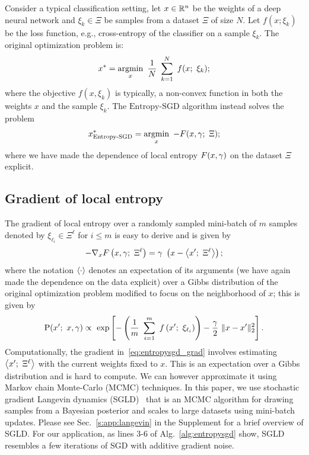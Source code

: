 \documentclass[10pt]{article}
\newcommand{\entropysgd}{\mathrm{Entropy}\textrm{-}\mathrm{SGD}}
\newcommand{\minibatch}[1]{\Xi^{#1}}
\begin{document}
Consider a typical classification setting, let $x \in \mathbb{R}^n$ be the weights of a deep neural network and $\xi_k \in \Xi$ be samples from a dataset $\Xi$ of size $N$. Let $f(x; \xi_k)$ be the loss function, e.g., cross-entropy of the classifier on a sample $\xi_k$. The original optimization problem is:
\begin{equation}
    x^* = \operatorname*{argmin}_x\ \frac{1}{N}\ \sum_{k=1}^N\ f(x;\ \xi_k);
    \label{eq:dnn_objective}
\end{equation}
where the objective $f(x, \xi_k)$ is typically, a non-convex function in both the weights $x$ and the sample $\xi_k$. The $\entropysgd$ algorithm instead solves the problem
\begin{equation}
    x^*_{\entropysgd} = \argmin_x\ -F(x, \gamma;\ \Xi);
    \label{eq:entropysgd_objective}
\end{equation}
where we have made the dependence of local entropy $F(x,\gamma)$ on the dataset $\Xi$ explicit.

\subsection{Gradient of local entropy}
\label{ss:grad_local_entropy}

The gradient of local entropy over a randomly sampled mini-batch of $m$ samples denoted by $\xi_{\ell_i} \in \minibatch{\ell}$ for $i \leq m$ is easy to derive and is given by
\begin{equation}
    -\nabla_x F\rbrac{x, \g;\ \minibatch{\ell}} = \g\ \rbrac{x - \ag{x';\ \minibatch{\ell}}};
    \label{eq:entropysgd_grad}
\end{equation}
where the notation $\left\langle\cdot\right\rangle$ denotes an expectation of its arguments (we have again made the dependence on the data explicit) over a Gibbs distribution of the original optimization problem modified to focus on the neighborhood of $x$; this is given by
\begin{equation}
    \P(x';\ x, \g) \propto\ \exp \sqbrac{-\rbrac{\f{1}{m}\ \sum_{i=1}^m\ f\rbrac{x';\ \xi_{\ell_i}}} - \f{\g}{2}\ \norm{x-x'}_2^2}.
    \label{eq:entropysgd_modified_gibbs}
\end{equation}
Computationally, the gradient in~\eqref{eq:entropysgd_grad} involves estimating $\ag{x';\ \minibatch{\ell}}$ with the current weights fixed to $x$. This is an expectation over a Gibbs distribution and is hard to compute. We can however approximate it using Markov chain Monte-Carlo (MCMC) techniques. In this paper, we use stochastic gradient Langevin dynamics (SGLD)~\citep{welling2011bayesian} that is an MCMC algorithm for drawing samples from a Bayesian posterior and scales to large datasets using mini-batch updates. Please see Sec.~\ref{s:app:langevin} in the Supplement for a brief overview of SGLD. For our application, as lines 3-6 of Alg.~\ref{alg:entropysgd} show, SGLD resembles a few iterations of SGD with additive gradient noise.
\end{document}
